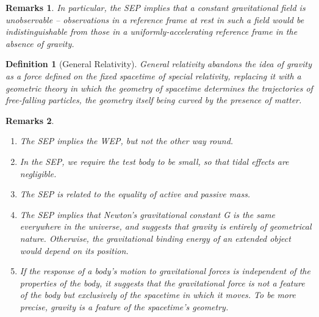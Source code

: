 \documentclass[a4paper]{article}
\newtheorem{remarks}{Remarks}[section]
\theoremstyle{new}
\newtheorem{defi}{Definition}[section]
\begin{document}
\begin{remarks}
In particular, the SEP implies that a constant gravitational field is unobservable – observations in a reference frame at rest in such a field would be indistinguishable from those in a uniformly-accelerating reference frame in the absence of gravity.
\end{remarks}
\begin{defi}[General Relativity]
General relativity abandons the idea of gravity as a force defined on the fixed spacetime of special relativity, replacing it with a geometric theory in which the geometry of spacetime determines the trajectories of free-falling particles, the geometry itself being curved by the presence of matter.
\end{defi}
\begin{remarks}\leavevmode
\begin{enumerate}
\item The SEP implies the WEP, but not the other way round.
\item In the SEP, we require the test body to be small, so that tidal effects are negligible. 
\item The SEP is related to the equality of active and passive mass. 
\item The SEP implies that Newton’s gravitational constant G is the same everywhere in the universe, and suggests that gravity is entirely of geometrical nature. Otherwise, the gravitational binding energy of an extended object would depend on its position.
\item If the response of a body’s motion to gravitational forces is independent of the properties of the body, it suggests that the gravitational force is not a feature of the body but exclusively of the spacetime in which it moves. To be more precise, gravity is a feature of the spacetime’s geometry.
\end{enumerate}
\end{remarks}
\newpage
\end{document}
